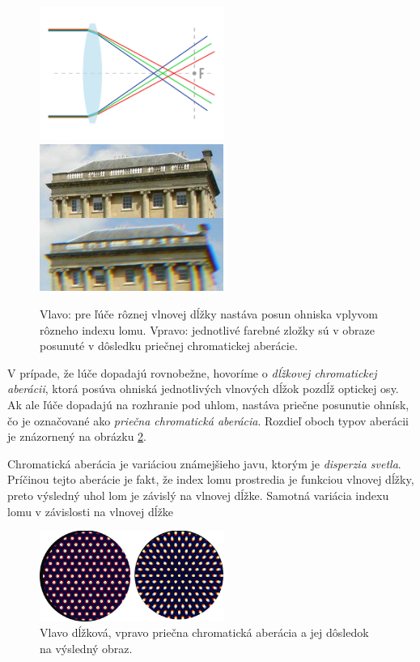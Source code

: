 \begin{figure}[h]
\centering
\label{chromaticFocus}
\includegraphics[width=6cm]{obrazky-figures/chromaticFocus.jpg}
\includegraphics[width=6cm]{obrazky-figures/chromaticAberrationWikipedia.jpg}
\caption{Vlavo: pre ľúče rôznej vlnovej dĺžky nastáva posun ohniska vplyvom rôzneho indexu lomu. Vpravo:
   jednotlivé farebné zložky sú v obraze posunuté v dôsledku priečnej chromatickej aberácie.}
\end{figure}

V prípade, že lúče dopadajú rovnobežne, hovoríme o
\textit{dĺžkovej chromatickej aberácii}, ktorá posúva ohniská jednotlivých vlnových dĺžok pozdĺž optickej
osy. Ak ale ľúče dopadajú na rozhranie pod uhlom, nastáva priečne posunutie ohnísk, čo je označované
ako \textit{priečna chromatická aberácia}. Rozdieľ oboch typov aberácii je znázornený na obrázku
\ref{chromaticDifference}.

Chromatická aberácia je variáciou známejšieho javu, ktorým je \textit{disperzia svetla}.
Príčinou tejto aberácie je fakt, že index lomu prostredia je funkciou vlnovej dĺžky, preto výsledný
uhol lom je závislý na vlnovej dĺžke. Samotná variácia indexu lomu v závislosti na vlnovej dĺžke 

\begin{figure}[h]
\centering
\label{chromaticDifference}
\includegraphics[width=6cm]{obrazky-figures/chromaticAberrationDifference.png}
\caption{Vlavo dĺžková, vpravo priečna chromatická aberácia a jej dôsledok na výsledný obraz.}
\end{figure}

